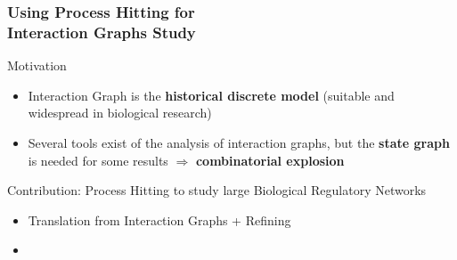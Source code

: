 \begin{frame}
\begin{center}
{
}
\end{center}
\end{frame}


\begin{frame}
  \frametitle{Using Process Hitting for\\Interaction Graphs Study}

\begin{block}{Motivation}
\begin{itemize}
  \item Interaction Graph is the \textbf{historical discrete model} (suitable and widespread in biological research) 
  \item Several tools exist of the analysis of interaction graphs, but the \textbf{state graph} is needed for some results $\Rightarrow$ \textbf{combinatorial explosion}
\end{itemize}  
\end{block}

\begin{block}{Contribution: Process Hitting to study large Biological Regulatory Networks}
\begin{itemize}
  \item Translation from Interaction Graphs + Refining
  \item {}
\end{itemize}
\end{block}

\end{frame}

